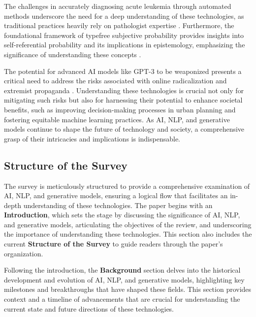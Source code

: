The challenges in accurately diagnosing acute leukemia through automated methods underscore the need for a deep understanding of these technologies, as traditional practices heavily rely on pathologist expertise \cite{zolfaghari2023surveyautomateddetectionclassification}. Furthermore, the foundational framework of typefree subjective probability provides insights into self-referential probability and its implications in epistemology, emphasizing the significance of understanding these concepts \cite{cieslinski2022axiomstypefreesubjectiveprobability}.



The potential for advanced AI models like GPT-3 to be weaponized presents a critical need to address the risks associated with online radicalization and extremist propaganda \cite{mcguffie2020radicalizationrisksgpt3advanced}. Understanding these technologies is crucial not only for mitigating such risks but also for harnessing their potential to enhance societal benefits, such as improving decision-making processes in urban planning and fostering equitable machine learning practices. As AI, NLP, and generative models continue to shape the future of technology and society, a comprehensive grasp of their intricacies and implications is indispensable.



\subsection{Structure of the Survey} \label{subsec:Structure of the Survey}



The survey is meticulously structured to provide a comprehensive examination of AI, NLP, and generative models, ensuring a logical flow that facilitates an in-depth understanding of these technologies. The paper begins with an \textbf{Introduction}, which sets the stage by discussing the significance of AI, NLP, and generative models, articulating the objectives of the review, and underscoring the importance of understanding these technologies. This section also includes the current \textbf{Structure of the Survey} to guide readers through the paper's organization.



Following the introduction, the \textbf{Background} section delves into the historical development and evolution of AI, NLP, and generative models, highlighting key milestones and breakthroughs that have shaped these fields. This section provides context and a timeline of advancements that are crucial for understanding the current state and future directions of these technologies.



